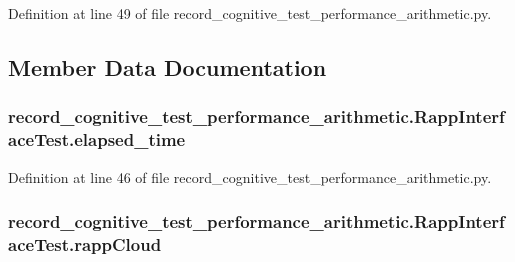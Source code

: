 Definition at line 49 of file record\-\_\-cognitive\-\_\-test\-\_\-performance\-\_\-arithmetic.\-py.



\subsection{Member Data Documentation}
\hypertarget{classrecord__cognitive__test__performance__arithmetic_1_1RappInterfaceTest_ac3c82e137896739c8ef461cb3eca222b}{
\subsubsection[{elapsed\-\_\-time}]{\setlength{\rightskip}{0pt plus 5cm}record\-\_\-cognitive\-\_\-test\-\_\-performance\-\_\-arithmetic.\-Rapp\-Interface\-Test.\-elapsed\-\_\-time}}\label{classrecord__cognitive__test__performance__arithmetic_1_1RappInterfaceTest_ac3c82e137896739c8ef461cb3eca222b}


Definition at line 46 of file record\-\_\-cognitive\-\_\-test\-\_\-performance\-\_\-arithmetic.\-py.

\hypertarget{classrecord__cognitive__test__performance__arithmetic_1_1RappInterfaceTest_a353e1b1ade0ec44e31ac16e3fe79bb27}{
\subsubsection[{rapp\-Cloud}]{\setlength{\rightskip}{0pt plus 5cm}record\-\_\-cognitive\-\_\-test\-\_\-performance\-\_\-arithmetic.\-Rapp\-Interface\-Test.\-rapp\-Cloud}}\label{classrecord__cognitive__test__performance__arithmetic_1_1RappInterfaceTest_a353e1b1ade0ec44e31ac16e3fe79bb27}


